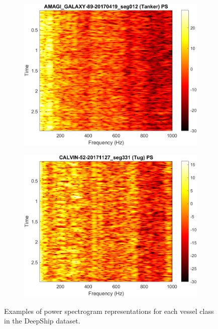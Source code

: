 \begin{figure}[p]
    \vspace{0.5cm} %

    \begin{subfigure}{0.49\textwidth}
        \centering
        \includegraphics[width=\linewidth]{img/ch3/power_spectrogram/Tanker.png} 
    \end{subfigure}
    \hfill
    \begin{subfigure}{0.49\textwidth}
        \centering
        \includegraphics[width=\linewidth]{img/ch3/power_spectrogram/Tug.png} 
    \end{subfigure}
    \caption{Examples of power spectrogram representations for each vessel class in the DeepShip dataset.}
    \label{fig:powerspectrogram-example}
\end{figure}

